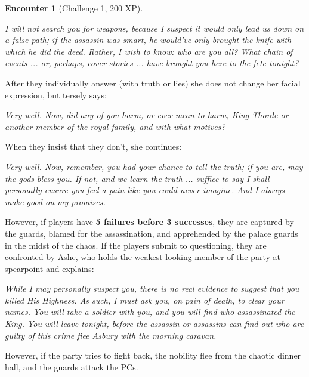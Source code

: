 \documentclass{report}
\theoremstyle{definition}
\newtheorem{enc}{Encounter}[chapter]
\begin{document}
\begin{enc}[Challenge 1, 200 XP]
\begin{displayquote}
\textit{I will not search you for weapons, because I suspect it would only lead us down on a false path; if the assassin was smart, he would've only brought the knife with which he did the deed.  Rather, I wish to know: who are you all?  What chain of events ... or, perhaps, cover stories ... have brought you here to the fete tonight?}
\end{displayquote}

After they individually answer (with truth or lies) she does not change her facial expression, but tersely says:

\begin{displayquote}
\textit{Very well.  Now, did any of you harm, or ever mean to harm, King Thorde or another member of the royal family, and with what motives?}
\end{displayquote}

When they insist that they don't, she continues:

\begin{displayquote}
\textit{Very well.  Now, remember, you had your chance to tell the truth; if you are, may the gods bless you.  If not, and we learn the truth ... suffice to say I shall personally ensure you feel a pain like you could never imagine. And I always make good on my promises.}
\end{displayquote}

However, if players have \textbf{5 failures before 3 successes}, they are captured by the guards, blamed for the assassination, and apprehended by the palace guards in the midst of the chaos. If the players submit to questioning, they are confronted by Ashe, who holds the weakest-looking member of the party at spearpoint and explains:

\begin{displayquote}
\textit{While I may personally suspect you, there is no real evidence to suggest that you killed His Highness.  As such, I must ask you, on pain of death, to clear your names.  You will take a soldier with you, and you will find who assassinated the King.  You will leave tonight, before the assassin or assassins can find out who are guilty of this crime flee Asbury with the morning caravan.}
\end{displayquote}

However, if the party tries to fight back, the nobility flee from the chaotic dinner hall, and the guards attack the PCs.
\end{enc}
\end{document}
